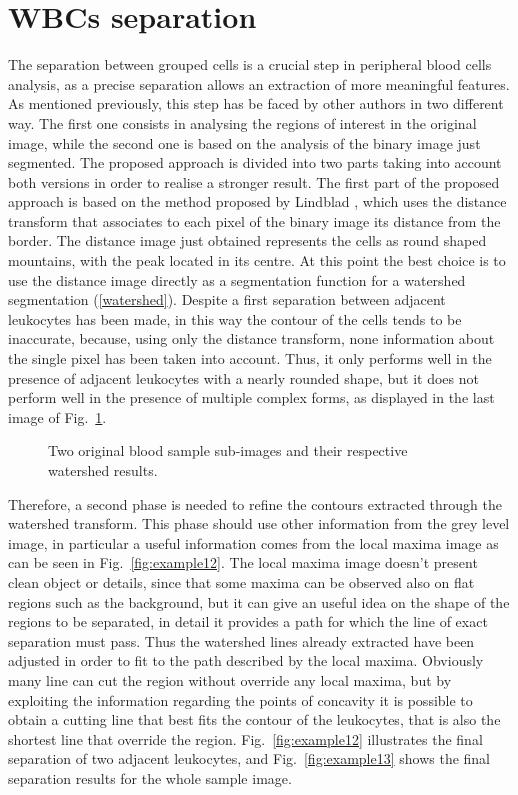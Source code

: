 \documentclass[final,a4paper,12pt,english]{UnicaPhdThesis3}
\begin{document}
	\section{WBCs separation}
	The separation between grouped cells is a crucial step in peripheral blood cells analysis, as a precise separation allows an extraction of more meaningful features. As mentioned previously, this step has be faced by other authors in two different way. The first one consists in analysing the regions of interest in the original image, while the second one is based on the analysis of the binary image just segmented. The proposed approach is divided into two parts taking into account both versions in order to realise a stronger result. The first part of the proposed approach is based on the method proposed by Lindblad \cite{Lindblad}, which uses the distance transform that associates to each pixel of the binary image its distance from the border. The distance image just obtained represents the cells as round shaped mountains, with the peak located in its centre. At this point the best choice is to use the distance image directly as a segmentation function for a watershed segmentation (\ref{watershed}). Despite a first separation between adjacent leukocytes has been made, in this way the contour of the cells tends to be inaccurate, because, using only the distance transform, none information about the single pixel has been taken into account. Thus, it only performs well in the presence of adjacent  leukocytes  with  a nearly  rounded  shape, but  it does not perform well in the presence of multiple complex forms, as displayed in the last image of Fig.~\ref{fig:example11}.
	
	\begin{figure}[!htbp]
		\centering
		\caption{\label{fig:example11}Two original blood sample sub-images and their respective watershed results. }
	\end{figure}
	
	Therefore, a second phase is needed to refine the contours extracted through the watershed transform. This phase should use other information from the grey level image, in particular a useful information comes from the local maxima image as can be seen in Fig.~\ref{fig:example12}. The local maxima image doesn't present clean object or details, since that some maxima can be observed also on flat regions such as the background, but it can give an useful idea on the shape of the regions to be separated, in detail it provides a path for which the line of exact separation must pass. Thus the watershed lines already extracted have been adjusted in order to fit to the path described by the local maxima. Obviously many 
	line can cut the region without override any local maxima, but by exploiting the information regarding the points of concavity it is possible to obtain a cutting line that best fits the contour of the leukocytes, that is also the shortest line that override the region. Fig.~\ref{fig:example12} illustrates the final separation of two adjacent leukocytes, and Fig.~\ref{fig:example13} shows the final separation results for the whole sample image.
	
\end{document}
